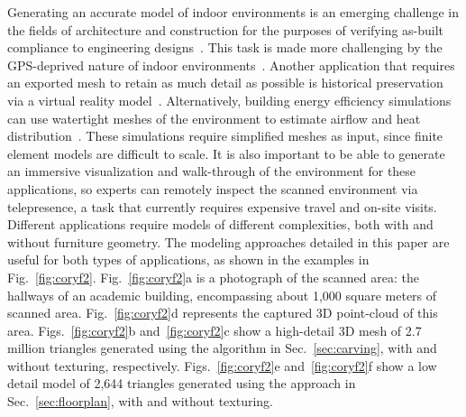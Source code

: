 \documentclass[10pt,twocolumn,twoside]{IEEEtran}
\begin{document}
Generating an accurate model of indoor environments is an emerging challenge in the fields of architecture and construction for the purposes of verifying as-built compliance to engineering designs~\cite{Bosche10,Xiong13}.  This task is made more challenging by the GPS-deprived nature of indoor environments~\cite{Liang13}.  Another application that requires an exported mesh to retain as much detail as possible is historical preservation via a virtual reality model~\cite{VillageHeritage,Carving}.  Alternatively, building energy efficiency simulations can use watertight meshes of the environment to estimate airflow and heat distribution~\cite{EnergyPlus}.  These simulations require simplified meshes as input, since finite element models are difficult to scale.  It is also important to be able to generate an immersive visualization and walk-through of the environment for these applications, so experts can remotely inspect the scanned environment via telepresence, a task that currently requires expensive travel and on-site visits.  Different applications require models of different complexities, both with and without furniture geometry.  The modeling approaches detailed in this paper are useful for both types of applications, as shown in the examples in Fig.~\ref{fig:coryf2}.  Fig.~\ref{fig:coryf2}a is a photograph of the scanned area: the hallways of an academic building, encompassing about 1,000 square meters of scanned area.  Fig.~\ref{fig:coryf2}d represents the captured 3D point-cloud of this area.  Figs.~\ref{fig:coryf2}b and~\ref{fig:coryf2}c show a high-detail 3D mesh of 2.7 million triangles generated using the algorithm in Sec.~\ref{sec:carving}, with and without texturing, respectively.  Figs.~\ref{fig:coryf2}e and~\ref{fig:coryf2}f show a low detail model of 2,644 triangles generated using the approach in Sec.~\ref{sec:floorplan}, with and without texturing.

\end{document}
